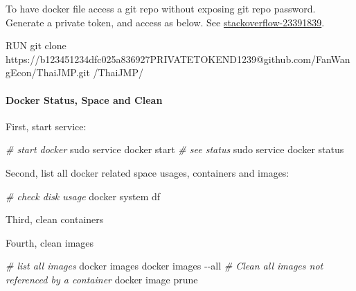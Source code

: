 \documentclass[
]{book}
\newenvironment{Shaded}{\begin{snugshade}}{\end{snugshade}}
\newcommand{\CommentTok}[1]{\textcolor[rgb]{0.56,0.35,0.01}{\textit{#1}}}
\newcommand{\ExtensionTok}[1]{#1}
\newcommand{\FunctionTok}[1]{\textcolor[rgb]{0.00,0.00,0.00}{#1}}
\newcommand{\NormalTok}[1]{#1}
\newcommand{\VariableTok}[1]{\textcolor[rgb]{0.00,0.00,0.00}{#1}}
\begin{document}
To have docker file access a git repo without exposing git repo password. Generate a private token, and access as below. See \href{https://stackoverflow.com/a/29464430/8280804}{stackoverflow-23391839}.

\begin{Shaded}
\begin{Highlighting}[]
\ExtensionTok{RUN}\NormalTok{ git clone https://b123451234dfc025a836927PRIVATETOKEND1239@github.com/FanWangEcon/ThaiJMP.git /ThaiJMP/}
\end{Highlighting}
\end{Shaded}

\hypertarget{docker-status-space-and-clean}{%
\paragraph{Docker Status, Space and Clean}\label{docker-status-space-and-clean}}

First, start service:

\begin{Shaded}
\begin{Highlighting}[]
\CommentTok{\# start docker}
\FunctionTok{sudo}\NormalTok{ service docker start}
\CommentTok{\# see status}
\FunctionTok{sudo}\NormalTok{ service docker status}
\end{Highlighting}
\end{Shaded}

Second, list all docker related space usages, containers and images:

\begin{Shaded}
\begin{Highlighting}[]
\CommentTok{\# check disk usage}
\ExtensionTok{docker}\NormalTok{ system df}
\end{Highlighting}
\end{Shaded}

Third, clean containers

\begin{Shaded}
\end{Shaded}

Fourth, clean images

\begin{Shaded}
\begin{Highlighting}[]
\CommentTok{\# list all images}
\ExtensionTok{docker}\NormalTok{ images}
\ExtensionTok{docker}\NormalTok{ images {-}{-}all}
\CommentTok{\# Clean all images not referenced by a container}
\ExtensionTok{docker}\NormalTok{ image prune}
\end{Highlighting}
\end{Shaded}
\end{document}
